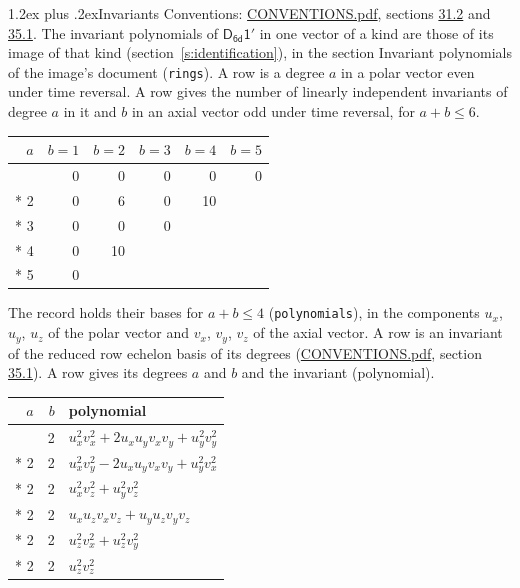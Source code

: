 \documentclass[10pt,a4paper]{article}
\makeatletter
\renewcommand\section{\@startsection{section}{1}{\z@}{-3ex plus -1ex minus -.2ex}%
  {1.2ex plus .2ex}{\normalfont\large\sffamily\bfseries\color{parttitle}}}
\numberwithin{equation}{section}
\newcommand{\grp}[1]{\mathsf{#1}}
\makeatother
\begin{document}
\section{Invariants}\label{s:invariants}
Conventions: \href{../../CONVENTIONS.pdf}{CONVENTIONS.pdf}, sections \href{../../CONVENTIONS.pdf\#conv.31.2}{31.2} and \href{../../CONVENTIONS.pdf\#conv.35.1}{35.1}.
The invariant polynomials of $\grp{D_{6d}1'}$ in one vector of a kind are those of its image of that kind (section~\ref{s:identification}), in the section Invariant polynomials of the image's document (\texttt{rings}).
\leavevmode\label{n:index.degree.polar}\label{n:index.degree.axial}A row is a degree $a$ in a polar vector even under time reversal. A row gives the number of linearly independent invariants of degree $a$ in it and $b$ in an axial vector odd under time reversal, for $a + b \le 6$.
{\small\begin{longtable}{@{}rrrrrr@{}}\toprule
$a$ & $b = 1$ & $b = 2$ & $b = 3$ & $b = 4$ & $b = 5$\\\midrule\endhead
\bottomrule\endfoot\endlastfoot
1 & 0 & 0 & 0 & 0 & 0\\*
2 & 0 & 6 & 0 & 10 & \\*
3 & 0 & 0 & 0 &  & \\*
4 & 0 & 10 &  &  & \\*
5 & 0 &  &  &  & \\
\bottomrule\end{longtable}}
\leavevmode\label{n:local.component.polar}\label{n:local.component.axial}The record holds their bases for $a + b \le 4$ (\texttt{polynomials}), in the components $u_{x}$, $u_{y}$, $u_{z}$ of the polar vector and $v_{x}$, $v_{y}$, $v_{z}$ of the axial vector. \label{n:head.polynomial}A row is an invariant of the reduced row echelon basis of its degrees (\href{../../CONVENTIONS.pdf}{CONVENTIONS.pdf}, section \href{../../CONVENTIONS.pdf\#conv.35.1}{35.1}). A row gives its degrees $a$ and $b$ and the invariant (polynomial).
{\small\renewcommand{\arraystretch}{1.2}\begin{longtable}{@{}rrl@{}}\toprule
$a$ & $b$ & polynomial\\\midrule\endhead
\bottomrule\endfoot\endlastfoot
2 & 2 & $u_{x}^{2}v_{x}^{2} + 2u_{x}u_{y}v_{x}v_{y} + u_{y}^{2}v_{y}^{2}$\\*
2 & 2 & $u_{x}^{2}v_{y}^{2} - 2u_{x}u_{y}v_{x}v_{y} + u_{y}^{2}v_{x}^{2}$\\*
2 & 2 & $u_{x}^{2}v_{z}^{2} + u_{y}^{2}v_{z}^{2}$\\*
2 & 2 & $u_{x}u_{z}v_{x}v_{z} + u_{y}u_{z}v_{y}v_{z}$\\*
2 & 2 & $u_{z}^{2}v_{x}^{2} + u_{z}^{2}v_{y}^{2}$\\*
2 & 2 & $u_{z}^{2}v_{z}^{2}$\\
\bottomrule\end{longtable}}
\end{document}
